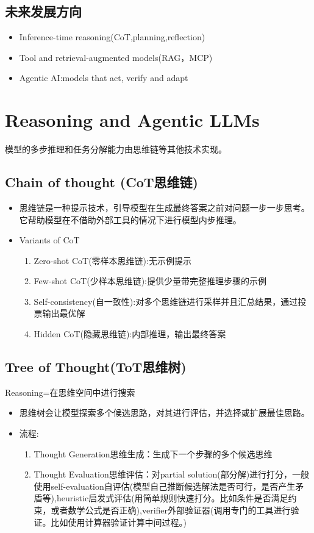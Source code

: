 \documentclass[UTF8]{ctexart}
\begin{document}
\subsection{未来发展方向}
\begin{itemize}
    \item Inference-time reasoning(CoT,planning,reflection)
    \item Tool and retrieval-augmented models(RAG，MCP)
    \item Agentic AI:models that act, verify and adapt
\end{itemize}

\section{Reasoning and Agentic LLMs}

模型的多步推理和任务分解能力由思维链等其他技术实现。

\subsection{Chain of thought (CoT思维链)}


\begin{itemize}
    \item 思维链是一种提示技术，引导模型在生成最终答案之前对问题一步一步思考。它帮助模型在不借助外部工具的情况下进行模型内步推理。
    \item Variants of CoT
    \begin{enumerate}
        \item Zero-shot CoT(零样本思维链):无示例提示
        \item Few-shot CoT(少样本思维链):提供少量带完整推理步骤的示例
        \item Self-consistency(自一致性):对多个思维链进行采样并且汇总结果，通过投票输出最优解
        \item Hidden CoT(隐藏思维链):内部推理，输出最终答案
    \end{enumerate}
\end{itemize}

\subsection{Tree of Thought(ToT思维树)}

Reasoning=在思维空间中进行搜索

\begin{itemize}
    \item 思维树会让模型探索多个候选思路，对其进行评估，并选择或扩展最佳思路。
    \item 流程:
    \begin{enumerate}
        \item Thought Generation思维生成：生成下一个步骤的多个候选思维
        \item Thought Evaluation思维评估：对partial solution(部分解)进行打分，一般使用self-evaluation自评估(模型自己推断候选解法是否可行，是否产生矛盾等),heuristic启发式评估(用简单规则快速打分。比如条件是否满足约束，或者数学公式是否正确),verifier外部验证器(调用专门的工具进行验证。比如使用计算器验证计算中间过程。)
    \end{enumerate}
\end{itemize}
\end{document}
